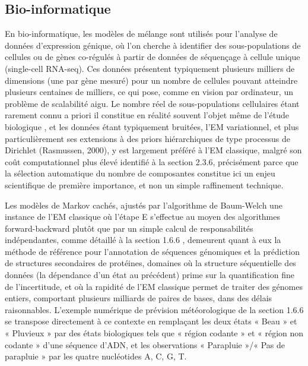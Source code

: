 \subsection{Bio-informatique}
En bio-informatique, les modèles de mélange sont utilisés pour l'analyse de données d'expression génique, où l'on cherche à identifier des sous-populations de cellules ou de gènes co-régulés à partir de données de séquençage à cellule unique (single-cell RNA-seq). Ces données présentent typiquement plusieurs milliers de dimensions (une par gène mesuré) pour un nombre de cellules pouvant atteindre plusieurs centaines de milliers, ce qui pose, comme en vision par ordinateur, un problème de scalabilité aigu. Le nombre réel de sous-populations cellulaires étant rarement connu a priori  il constitue en réalité souvent l'objet même de l'étude biologique , et les données étant typiquement bruitées, l'EM variationnel, et plus particulièrement ses extensions à des priors hiérarchiques de type processus de Dirichlet (Rasmussen, 2000), y est largement préféré à l'EM classique, malgré son coût computationnel plus élevé identifié à la section 2.3.6, précisément parce que la sélection automatique du nombre de composantes constitue ici un enjeu scientifique de première importance, et non un simple raffinement technique.

Les modèles de Markov cachés, ajustés par l'algorithme de Baum-Welch  une instance de l'EM classique où l'étape E s'effectue au moyen des algorithmes forward-backward plutôt que par un simple calcul de responsabilités indépendantes, comme détaillé à la section 1.6.6 , demeurent quant à eux la méthode de référence pour l'annotation de séquences génomiques et la prédiction de structures secondaires de protéines, domaines où la structure séquentielle des données (la dépendance d'un état au précédent) prime sur la quantification fine de l'incertitude, et où la rapidité de l'EM classique permet de traiter des génomes entiers, comportant plusieurs milliards de paires de bases, dans des délais raisonnables. L'exemple numérique de prévision météorologique de la section 1.6.6 se transpose directement à ce contexte en remplaçant les deux états « Beau » et « Pluvieux » par des états biologiques tels que « région codante » et « région non codante » d'une séquence d'ADN, et les observations « Parapluie »/« Pas de parapluie » par les quatre nucléotides A, C, G, T.

